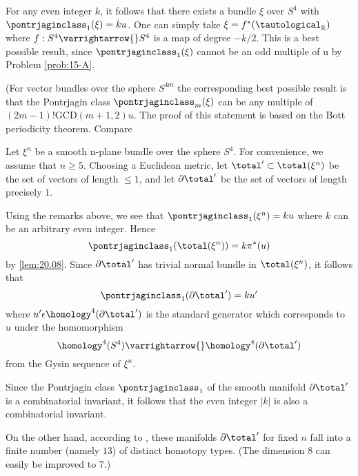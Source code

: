 \documentclass[../main]{subfiles}
\begin{document}
For any even integer $k$, it follows that there exists a bundle $\xi$ over $S^{4}$ with $\pontrjaginclass_{1}(\xi)=ku$. One can simply take $\xi=f^{*}(\tautological_{\mathbb{R}})$ where $f: S^{4} \varrightarrow{} S^{4}$ is a map of degree $-k / 2$. This is a best possible result, since $\pontrjaginclass_{1}(\xi)$ cannot be an odd multiple of u by Problem \ref{prob:15-A}.

(For vector bundles over the sphere $S^{4 m}$ the corresponding best possible result is that the Pontrjagin class $\pontrjaginclass_{m}(\xi)$ can be any multiple of \newline $(2m-1)!\mathrm{GCD}(m+1,2) u$. The proof of this statement is based on the Bott periodicity theorem. Compare \cite{bott1970}
\setcounter{example}{0}

\begin{example}
Let $\xi^{n}$ be a smooth n-plane bundle over the sphere $S^{4}$. For convenience, we assume that $n \geq 5$. Choosing a Euclidean metric, let $\total^{\prime} \subset \total(\xi^{n})$ be the set of vectors of length $\leq 1$, and let $\partial \total^{\prime}$ be the set of vectors of length precisely $1 .$
\end{example} 

Using the remarks above, we see that $\pontrjaginclass_{1}(\xi^{n})=ku$ where $k$ can be an arbitrary even integer. Hence
\[
\pontrjaginclass_{1}(\total(\xi^{n}))=k \pi^{*}(u)
\]
by \ref{lem:20.08}. Since $\partial \total^{\prime}$ has trivial normal bundle in $\total(\xi^{n})$, it follows that
\[
\pontrjaginclass_{1}(\partial \total^{\prime})=ku^{\prime}
\]
where $u^{\prime} \epsilon \homology^{4}(\partial \total^{\prime})$ is the standard generator which corresponds to $u$ under the homomorphism
\[
\homology^{4}(S^{4}) \varrightarrow{} \homology^{4}(\partial \total^{\prime})
\]
from the Gysin sequence of $\xi^{n}$.

Since the Pontrjagin class $\pontrjaginclass_{1}$ of the smooth manifold $\partial \total^{\prime}$ is a combinatorial invariant, it follows that the even integer $|k|$ is also a combinatorial invariant. 

On the other hand, according to \cite{james1954}, these manifolds $\partial \total^{\prime}$ for fixed $n$ fall into a finite number (namely $13$) of distinct homotopy types.  (The dimension $8$ can easily be improved to $7$.)
\end{document}
